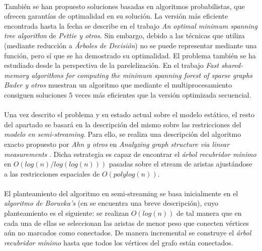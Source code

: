 \documentclass{subfiles}
\begin{document}
        \paragraph{}
        También se han propuesto soluciones basadas en algoritmos probabilistas, que ofrecen garantías de optimalidad en su solución. La versión más eficiente encontrada hasta la fecha se describe en el trabajo \emph{An optimal minimum spanning tree algorithm} \cite{pettie2002optimal} de \emph{Pettie y otros}. Sin embargo, debido a las técnicas que utiliza (mediante reducción a \emph{Árboles de Decisión}) no se puede representar mediante una función, pero sí que se ha demostrado su optimalidad. El problema también se ha estudiado desde la perspectiva de la parelelización. En el trabajo \emph{Fast shared-memory algorithms for computing the minimum spanning forest of sparse graphs} \cite{bader2006fast} \emph{Bader y otros} muestran un algoritmo que mediante el multiprocesamiento consiguen soluciones $5$ veces más eficientes que la versión optimizada secuencial.

        \paragraph{}
        Una vez descrito el problema y su estado actual sobre el modelo estático, el resto del apartado se basará en la descripción del mismo sobre las restricciones del \emph{modelo en semi-streaming}. Para ello, se realiza una descripción del algoritmo exacto propuesto por \emph{Ahn y otros} en \emph{Analyzing graph structure via linear measurements} \cite{ahn2012analyzing}. Dicha estrategia es capaz de encontrar el \emph{árbol recubridor mínimo} en $O(log(n)/log(log(n)))$ pasadas sobre el stream de aristas ajustándose a las restricciones espaciales de $O(polylog(n))$.

        \paragraph{}
        El planteamiento del algoritmo en semi-streaming se basa inicialmente en el \emph{algoritmo de Boruvka’s} (en \cite{wiki:Boruvkas_algorithm} se encuentra una breve descripción), cuyo planteamiento es el siguiente: se realizan $O(log(n))$ de tal manera que en cada una de ellas se seleccionan las aristas de menor peso que conecten vértices aún no marcados como conectados. De manera incremental se construye el \emph{árbol recubridor mínimo} hasta que todos los vértices del grafo están conectados.
\end{document}
